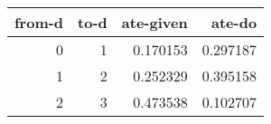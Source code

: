 \begin{tabular}{rrrr}
\toprule
 from-d &  to-d &  ate-given &   ate-do \\
\midrule
      0 &     1 &   0.170153 & 0.297187 \\
      1 &     2 &   0.252329 & 0.395158 \\
      2 &     3 &   0.473538 & 0.102707 \\
\bottomrule
\end{tabular}
